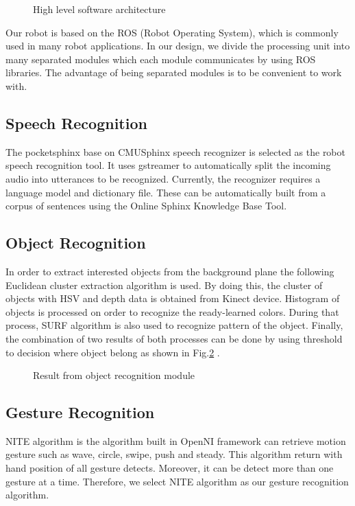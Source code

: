 \documentclass{llncs}
\begin{document}
\begin{figure}
\centering
\caption{High level software architecture}
\label{fig:soft_arc}
\end{figure}

Our robot is based on the ROS (Robot Operating System), which is commonly used in many robot applications. In our design, we divide the processing unit into many separated modules which each module communicates by using ROS libraries. The advantage of being separated modules is to be convenient to work with.

\subsection{Speech Recognition}

The pocketsphinx base on CMUSphinx speech recognizer is selected as the robot speech recognition tool. It uses gstreamer to automatically split the incoming audio into utterances to be recognized. Currently, the recognizer requires a language model and dictionary file. These can be automatically built from a corpus of sentences using the Online Sphinx Knowledge Base Tool.

\subsection{Object Recognition}

In order to extract interested objects from the background plane the following Euclidean cluster extraction algorithm\cite{ece}\cite{rudu.thesis} is used. By doing this, the cluster of objects with HSV and depth data is obtained from Kinect device. Histogram of objects is processed on order to recognize the ready-learned colors. During that process, SURF algorithm is also used to recognize pattern of the object. Finally, the combination of two results of both processes can be done by using threshold to decision where object belong as shown in Fig.\ref{fig:object_recog} .

\begin{figure}
\centering
\caption{Result from object recognition module}
\label{fig:object_recog}
\end{figure}

\subsection{Gesture Recognition}

NITE algorithm is the algorithm built in OpenNI framework can retrieve motion gesture such as wave, circle, swipe, push and steady. This algorithm return with hand position of all gesture detects.
Moreover, it can be detect more than one gesture at a time. Therefore, we select NITE algorithm as our
gesture recognition algorithm.
\end{document}
